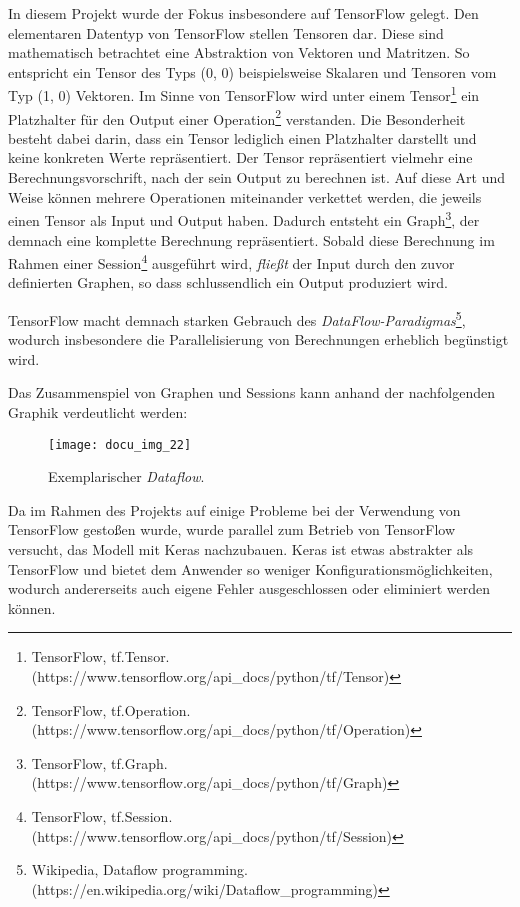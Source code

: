 In diesem Projekt wurde der Fokus insbesondere auf TensorFlow gelegt. Den elementaren Datentyp von TensorFlow stellen
Tensoren dar. Diese sind mathematisch betrachtet eine Abstraktion von Vektoren und Matritzen. So entspricht ein Tensor
des Typs (0, 0) beispielsweise Skalaren und Tensoren vom Typ (1, 0) Vektoren.
Im Sinne von TensorFlow wird unter einem Tensor\footnote{TensorFlow, tf.Tensor.\newline(https://www.tensorflow.org/api\_docs/python/tf/Tensor)}
ein Platzhalter für den Output einer Operation\footnote{TensorFlow, tf.Operation.\newline(https://www.tensorflow.org/api\_docs/python/tf/Operation)} verstanden.
Die Besonderheit besteht dabei darin, dass ein Tensor lediglich einen Platzhalter darstellt und keine konkreten Werte
repräsentiert. Der Tensor repräsentiert vielmehr eine Berechnungsvorschrift, nach der sein Output zu berechnen ist.
Auf diese Art und Weise können mehrere Operationen miteinander verkettet werden, die jeweils einen Tensor als Input und
Output haben. Dadurch entsteht ein Graph\footnote{TensorFlow, tf.Graph.\newline(https://www.tensorflow.org/api\_docs/python/tf/Graph)},
der demnach eine komplette Berechnung repräsentiert. Sobald diese Berechnung im Rahmen einer Session\footnote{TensorFlow, tf.Session.\newline(https://www.tensorflow.org/api\_docs/python/tf/Session)}
ausgeführt wird, \textit{fließt} der Input durch den zuvor definierten Graphen, so dass schlussendlich ein Output
produziert wird.

TensorFlow macht demnach starken Gebrauch des \textit{DataFlow-Paradigmas}\footnote{Wikipedia, Dataflow programming.\newline(https://en.wikipedia.org/wiki/Dataflow\_programming)},
wodurch insbesondere die Parallelisierung von Berechnungen erheblich begünstigt wird.

Das Zusammenspiel von Graphen und Sessions kann anhand der nachfolgenden Graphik verdeutlicht werden:

\begin{figure}[H]
    \centering
    \texttt{[image: docu\_img\_22]}
    \caption{Exemplarischer \textit{Dataflow}.}
    \label{fig:tf-api}
\end{figure}
\par
Da im Rahmen des Projekts auf einige Probleme bei der Verwendung von TensorFlow gestoßen wurde, wurde parallel zum
Betrieb von TensorFlow versucht, das Modell mit Keras nachzubauen. Keras ist etwas abstrakter als TensorFlow und bietet
dem Anwender so weniger Konfigurationsmöglichkeiten, wodurch andererseits auch eigene Fehler ausgeschlossen oder eliminiert
werden können.


